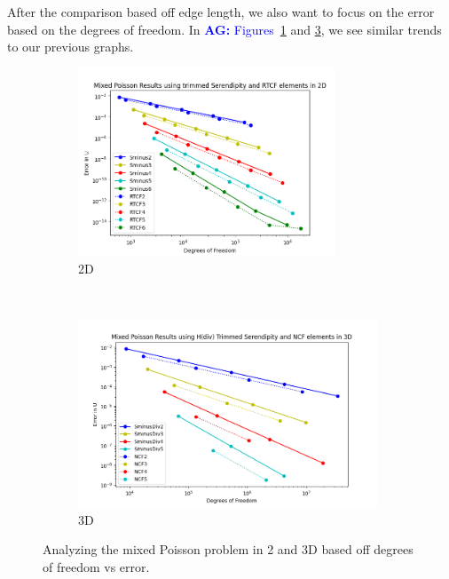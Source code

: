 \documentclass[manuscript,screen]{acmart}
\newcommand{\akg}[1]{\textcolor{blue}{\textbf{AG:} #1}}
\begin{document}

\noindent After the comparison based off edge length, we also want to focus on the error based on the degrees of freedom.  In \akg{Figures}~\ref{fig:2dMixedDofs} and \ref{fig:3dMixedDofs}, we see similar trends to our previous graphs.

\begin{figure}[h!]
  \centering
  \begin{subfigure}[h]{0.5\textwidth}
    \centering
    \includegraphics[height=2.2in]{MixedPoisson-2d-SminusDiv_RTCF.png}
    \caption{2D}
    \label{fig:2dMixedDofs}
  \end{subfigure}
  ~
  \begin{subfigure}[h]{0.5\textwidth}
    \centering
    \includegraphics[height=2.2in]{MixedPoisson3d_TrimmedSerendipityNCF.png}
    \caption{3D}
    \label{fig:3dMixedDofs}
  \end{subfigure}
  \caption{Analyzing the mixed Poisson problem in 2 and 3D based off degrees of freedom vs error.}
\end{figure} 
\end{document}
